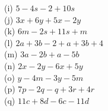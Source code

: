 \documentclass{article}
\begin{document}
(i) \quad \( 5 - 4s - 2 + 10s \) \\

(j) \quad \( 3x + 6y + 5x - 2y \) \\

(k) \quad \( 6m - 2s + 11s + m \) \\

(l) \quad \( 2a + 3b - 2 + a + 3b + 4 \) \\

(m) \quad \( 3a - 2b + a - 5b \) \\

(n) \quad \( 2x - 2y - 6x + 5y \) \\

(o) \quad \( y - 4m - 3y - 5m \) \\ 

(p) \quad \( 7p - 2q - q + 3r + 4r \) \\ 

(q) \quad \( 11c + 8d - 6c - 11d \) \\ 
\end{document}
